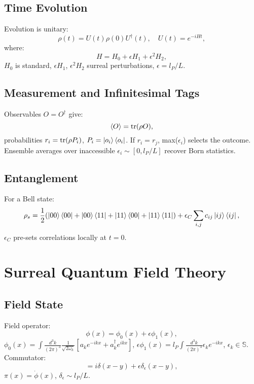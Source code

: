 \documentclass{article}
\begin{document}
\subsection{Time Evolution}
Evolution is unitary:
\begin{equation}
\rho(t) = U(t) \rho(0) U^\dagger(t), \quad U(t) = e^{-i H t},
\end{equation}
where:
\begin{equation}
H = H_0 + \epsilon H_1 + \epsilon^2 H_2,
\end{equation}
\(H_0\) is standard, \(\epsilon H_1\), \(\epsilon^2 H_2\) surreal perturbations, \(\epsilon = l_P / L\).

\subsection{Measurement and Infinitesimal Tags}
Observables \(O = O^\dagger\) give:
\begin{equation}
\ev{O} = \tr(\rho O),
\end{equation}
probabilities \(r_i = \tr(\rho P_i)\), \(P_i = \ket{o_i}\bra{o_i}\). If \(r_i = r_j\), max(\(\epsilon_i\)) selects the outcome. Ensemble averages over inaccessible \(\epsilon_i \sim [0, l_P/L]\) recover Born statistics.

\subsection{Entanglement}
For a Bell state:
\begin{equation}
\rho_s = \frac{1}{2} (\ket{00}\bra{00} + \ket{00}\bra{11} + \ket{11}\bra{00} + \ket{11}\bra{11}) + \epsilon_C \sum_{i,j} c_{ij} \ket{ij}\bra{ij},
\end{equation}
\(\epsilon_C\) pre-sets correlations locally at \(t=0\).

\section{Surreal Quantum Field Theory}
\subsection{Field State}
Field operator:
\begin{equation}
\phi(x) = \phi_0(x) + \epsilon \phi_1(x),
\end{equation}
\(\phi_0(x) = \int \frac{d^3k}{(2\pi)^3} \frac{1}{\sqrt{2\omega_k}} [a_k e^{-ikx} + a_k^\dagger e^{ikx}]\), \(\epsilon \phi_1(x) = l_P \int \frac{d^3k}{(2\pi)^3} \epsilon_k e^{-ikx}\), \(\epsilon_k \in \mathbb{S}\). Commutator:
\begin{equation}
[\phi(x), \pi(y)] = i \delta(x-y) + \epsilon \delta_\epsilon(x-y),
\end{equation}
\(\pi(x) = \dot{\phi}(x)\), \(\delta_\epsilon \sim l_P / L\).
\end{document}
